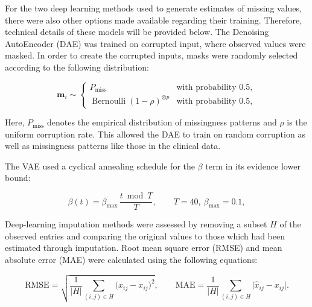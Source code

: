 For the two deep learning methods used to generate estimates of missing values, there were also other options made available regarding their training. Therefore, technical details of these models will be provided below. The Denoising AutoEncoder (DAE) was trained on corrupted input, where observed values were masked. In order to create the corrupted inputs, masks were randomly selected according to the following distribution:

\begin{equation}\label{eq:dae_corrupt}
\mathbf{m}_i\sim
\begin{cases}
P_{\mathrm{miss}} & \text{with probability } 0.5,\\[2pt]
\operatorname{Bernoulli}(1-\rho)^{\otimes p} & \text{with probability } 0.5,
\end{cases}
\end{equation}

Here, \(P_{\mathrm{miss}}\) denotes the empirical distribution of missingness patterns and \(\rho\) is the uniform corruption rate. This allowed the DAE to train on random corruption as well as missingness patterns like those in the clinical data.

The VAE used a cyclical annealing schedule for the \(\beta\) term in its evidence lower bound:

\begin{equation}\label{eq:beta_cyclical}
\beta(t)=\beta_{\max}\,\frac{t \bmod T}{T},\qquad T=40,\ \beta_{\max}=0.1,
\end{equation}

Deep-learning imputation methods were assessed by removing a subset \(H\) of the observed entries and comparing the original values to those which had been estimated through imputation. Root mean square error (RMSE) and mean absolute error (MAE) were calculated using the following equations:

\begin{equation}\label{eq:rmse}
\mathrm{RMSE}=\sqrt{\frac{1}{|H|}\sum_{(i,j)\in H}\bigl(\hat{x}_{ij}-x_{ij}\bigr)^2},\qquad
\mathrm{MAE}=\frac{1}{|H|}\sum_{(i,j)\in H}\bigl|\hat{x}_{ij}-x_{ij}\bigr|.
\end{equation}

